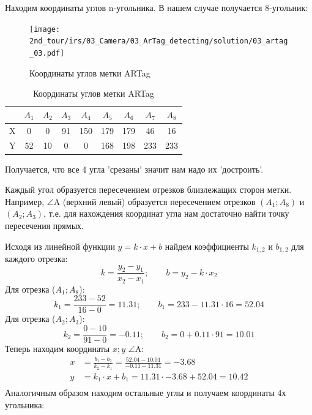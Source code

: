 Находим координаты углов n-угольника. В нашем случае получается 8-угольник:
\begin{figure}[H]
	\centering
	\texttt{[image: 2nd\_tour/irs/03\_Camera/03\_ArTag\_detecting/solution/03\_artag\_03.pdf]}
	\caption{Координаты углов метки ARTag}
	\label{fig:03_artag_03}
\end{figure}

\begin{table}[H]
	\begin{center}
		\begin{tabular}{|c|c|c|c|c|c|c|c|c|}		
			\hline 
			& $A_1$ & $A_2$ & $A_3$ & $A_4$ & $A_5$ & $A_6$ & $A_7$ & $A_8$ \\ 
			\hline 
			X & 0 & 0 & 91 & 150 & 179 & 179 & 46 & 16 \\ 
			\hline 
			Y & 52 & 10 & 0 & 0 & 168 & 198 & 233 & 233 \\ 
			\hline 
		\end{tabular} 
		\caption{Координаты углов метки ARTag}
	\end{center}
\end{table}


Получается, что все 4 угла 'срезаны' значит нам надо их 'достроить'.

Каждый угол образуется пересечением отрезков близлежащих сторон метки. Например, $\angle$A (верхний левый) образуется пересечением отрезков $(A_1; A_8)$ и $(A_2; A_3)$, т.е. для нахождения координат угла нам достаточно найти точку пересечения прямых.

Исходя из линейной функции $y = k \cdot x + b$ найдем коэффициенты $k_{1,2}$ и $b_{1,2}$ для каждого отрезка:
\begin{equation*}
k=\frac{y_2-y_1}{x_2-x_1}; \qquad
b = y_2 - k \cdot x_2
\end{equation*}
Для отрезка ($A_1; A_8$):
\begin{equation*}
k_1=\frac{233-52}{16-0} = 11.31; \qquad
b_1 = 233 - 11.31 \cdot 16 = 52.04
\end{equation*}
Для отрезка ($A_2; A_3$):
\begin{equation*}
k_2 = \frac{0-10}{91-0} = -0.11; \qquad
b_2 = 0 + 0.11 \cdot 91 = 10.01
\end{equation*}
Теперь находим координаты $x; y$ $\angle$A:
\begin{equation*}
\begin{aligned}
x & = \frac{b_1-b_2}{k_2-k_1} =  \frac{52.04-10.01}{-0.11 - 11.31} = -3.68 \\
y &= k_1 \cdot x + b_1 = 11.31 \cdot -3.68 + 52.04 = 10.42 \\		
\end{aligned}
\end{equation*}
Аналогичным образом находим остальные углы и получаем координаты 4х угольника:\\

